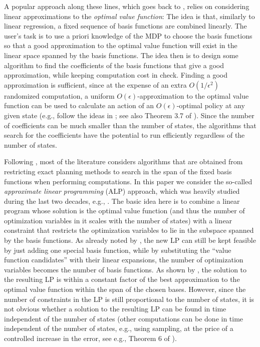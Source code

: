 \documentclass[twocolumn]{IEEEtran}
\begin{document}
A popular approach along these lines, which goes back to \citet{SchSei85},
relies on considering linear approximations to the \emph{optimal value function}:
The idea is that, similarly to linear regression, a fixed sequence of basis functions are combined
linearly. The user's task is to use a priori knowledge of the MDP
to choose the basis functions so that
a good approximation to the optimal value function will exist in the linear space spanned by the basis functions.
The idea then is to design some algorithm to find the coefficients of the basis functions that give a good approximation,
while keeping computation cost in check.
Finding a good approximation is sufficient, since at the expense of an extra $O(1/\epsilon^2)$ randomized computation,
a uniform $O(\epsilon)$-approximation
to the optimal value function can be used to calculate an action of an $O(\epsilon)$-optimal policy at any given state
(e.g., follow the ideas in \cite{szepesvari2001,kearns2002sparse}; see also Theorem 3.7 of \citet{Kall17}).
Since the number of coefficients can be much smaller than the number of states, the algorithms that search
for the coefficients have the potential to run efficiently regardless of the number of states.


Following \citet{SchSei85}, most of the literature considers
algorithms that are obtained from restricting exact planning methods to search
in the span of the fixed basis functions when performing computations.
In this paper we consider the so-called \emph{approximate linear programming} (ALP) approach, which
was heavily studied during the last two decades, e.g.,
\cite{
schuurmans,
gkp,
ALP,
CS,
kveton2004heuristic,
petrik,
SALP,
fs,
npalp,
BhatFaMo12:SALPNP,
abbasi}.
The basic idea here is to combine a linear program whose solution is the optimal value function (and thus the number of optimization variables in it scales with the number of states) with a linear constraint that restricts the optimization variables to lie in the subspace spanned by the basis functions. As already noted by \citet{SchSei85}, the new LP can still be kept feasible by just adding one special basis function, while by substituting the ``value function candidates'' with their linear expansions, the number of optimization variables becomes the number of basis functions.
As shown by \citet{ALP}, the solution to the resulting LP is within a constant factor of the best approximation to the optimal value function within the span of the chosen bases. However, since the number of constraints in the LP is still proportional to the number of states, it is not obvious whether a solution to the resulting LP can be found in time independent of the number of states (other computations can be done in time independent of the number of states, e.g., using sampling, at the price of a controlled increase in the error, see e.g., Theorem 6 of \citep{petrik}).
\end{document}
